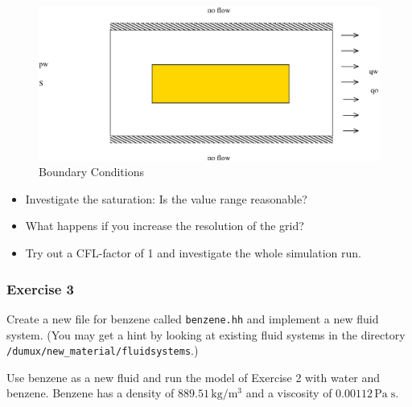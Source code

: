 \begin{figure}[h]
\centering
\includegraphics[width=0.8\linewidth,keepaspectratio]{EPS/Ex2_Boundary.eps}
\caption{Boundary Conditions}\label{tutorial-coupled:ex2_BC}
\end{figure}

\begin{itemize}
 \item Investigate the saturation: Is the value range reasonable?
 \item What happens if you increase the resolution of the grid?
 \item Try out a CFL-factor of 1 and investigate the whole simulation run.
\end{itemize}


\subsubsection{Exercise 3}
Create a new file for benzene called \texttt{benzene.hh} and implement
a new fluid system. (You may get a hint by looking at existing fluid 
systems in the directory \verb+/dumux/new_material/fluidsystems+.)

Use benzene as a new fluid and run the model of Exercise 2 with water
and benzene. Benzene has a density of $889.51 \, \text{kg} / \text{m}^3$
and a viscosity of $0.00112 \, \text{Pa} \; \text{s}$. 
